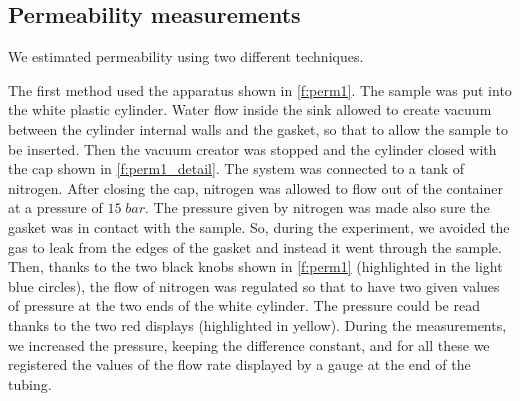 \documentclass[10pt, a4paper]{amsart}
\begin{document}
\subsection{Permeability measurements}
We estimated permeability using two different techniques.

The first method used the apparatus shown in \cref{f:perm1}. The sample was put into the white plastic cylinder. Water flow inside the sink allowed to create vacuum between the cylinder internal walls and the gasket, so that to allow the sample to be inserted. Then the vacuum creator was stopped and the cylinder closed with the cap shown
in \cref{f:perm1_detail}. The system was connected to a tank of nitrogen. After closing the cap, nitrogen was allowed to flow out of the container at a pressure of $15\;bar$. The pressure given by nitrogen was made also sure the gasket was in contact with the sample. So, during the experiment, we avoided the gas to leak from the edges of the gasket and instead it went through the sample. Then, thanks to the two black knobs shown in \cref{f:perm1} (highlighted in the light blue circles), the flow of nitrogen was regulated so that to have two given values of pressure at the two ends of the white cylinder. The pressure could be read thanks to the two red displays (highlighted in yellow). During the measurements, we increased the pressure, keeping the difference constant, and for all these we registered the values of the flow rate displayed by a gauge at the end of the tubing.
\end{document}

